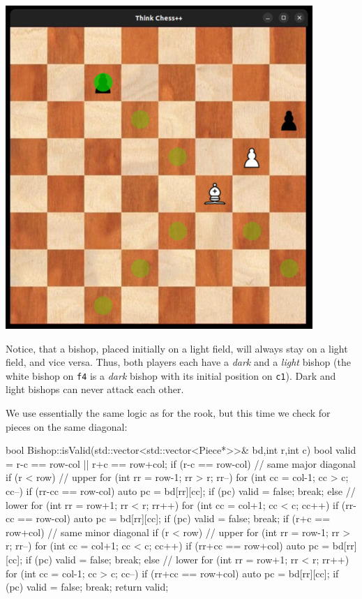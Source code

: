 \begin{center}
\includegraphics[width=.5\linewidth]{../img/bishop}
\end{center}

Notice, that a bishop, placed initially on a light field, will always stay on a light field,
and vice versa.
Thus, both players each have a \emph{dark} and a \emph{light} bishop (the white bishop on
\texttt{f4} is a \emph{dark} bishop with its initial position on \texttt{c1}).
Dark and light bishops can never attack each other.

We use essentially the same logic as for the rook, but this time we check for pieces on
the same diagonal:

\begin{cpp}
bool Bishop::isValid(std::vector<std::vector<Piece*>>& bd,int r,int c) {
  bool valid = r-c == row-col || r+c == row+col;
  if (r-c == row-col) { // same major diagonal
    if (r < row) { // upper
      for (int rr = row-1; rr > r; rr--) {
        for (int cc = col-1; cc > c; cc--) {
          if (rr-cc == row-col) {
            auto pc = bd[rr][cc];
            if (pc) { valid = false; break; }
          }
        }
      }
    } else { // lower
      for (int rr = row+1; rr < r; rr++) {
        for (int cc = col+1; cc < c; cc++) {
          if (rr-cc == row-col) {
            auto pc = bd[rr][cc];
            if (pc) { valid = false; break; }
          }
        }
      }
    }
  }
  if (r+c == row+col) { // same minor diagonal
    if (r < row) { // upper
      for (int rr = row-1; rr > r; rr--) {
        for (int cc = col+1; cc < c; cc++) {
          if (rr+cc == row+col) {
            auto pc = bd[rr][cc];
            if (pc) { valid = false; break; }
          }
        }
      }
    } else { // lower
      for (int rr = row+1; rr < r; rr++) {
        for (int cc = col-1; cc > c; cc--) {
          if (rr+cc == row+col) {
            auto pc = bd[rr][cc];
            if (pc) { valid = false; break; }
          }
        }
      }
    }
  }
  return valid;
}
\end{cpp}

